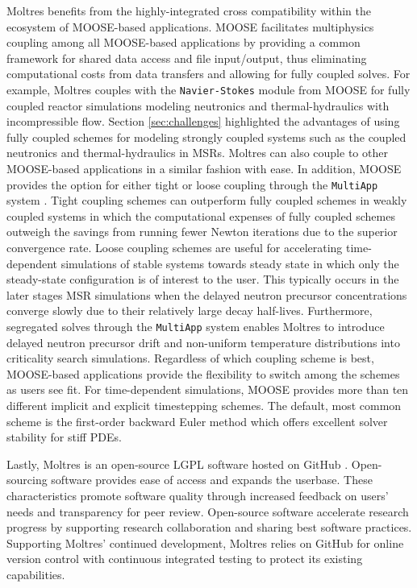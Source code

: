 Moltres benefits from the highly-integrated cross compatibility within the
ecosystem of MOOSE-based applications. MOOSE facilitates multiphysics coupling
among all MOOSE-based applications by providing a common framework for shared
data access and file input/output, thus eliminating computational costs from
data transfers and allowing for fully coupled solves. For example, Moltres
couples with the \texttt{Navier-Stokes} module \cite{peterson_overview_2018}
from MOOSE for fully coupled reactor simulations modeling neutronics and
thermal-hydraulics with incompressible flow. Section
\ref{sec:challenges} highlighted the advantages of using fully coupled schemes
for modeling strongly coupled systems such as the coupled
neutronics and thermal-hydraulics in \glspl{MSR}. Moltres can also
couple to other MOOSE-based applications in a similar fashion with ease. In
addition, MOOSE
provides the option for either tight or loose coupling through the
\texttt{MultiApp} system \cite{gaston_physics-based_2015}. Tight coupling
schemes can outperform fully coupled schemes in weakly coupled systems in which
the computational expenses of fully coupled schemes outweigh the savings from
running fewer Newton iterations due to the superior convergence rate. Loose
coupling schemes are useful for accelerating time-dependent simulations of
stable systems towards steady state in which only the steady-state
configuration is of interest to the user. This typically occurs in the later
stages \gls{MSR} simulations when the delayed neutron precursor concentrations
converge slowly due to their relatively large decay half-lives. Furthermore,
segregated solves through the \texttt{MultiApp} system enables Moltres to
introduce delayed neutron precursor drift and non-uniform temperature
distributions into criticality search simulations. Regardless of which
coupling scheme is best, MOOSE-based applications provide the flexibility
to switch among the schemes as users see fit. For time-dependent simulations,
MOOSE provides more than ten different implicit and explicit timestepping
schemes. The default, most common scheme is the first-order backward Euler
method which offers excellent solver stability for stiff \glspl{PDE}.

Lastly, Moltres is an open-source \gls{LGPL} software hosted on
GitHub \cite{github_build_2017}. Open-sourcing software provides ease of access
and expands the userbase. These characteristics promote software quality
through increased feedback on users' needs and transparency for peer review.
Open-source software accelerate research progress by supporting research
collaboration and sharing best software practices. Supporting Moltres'
continued development, Moltres relies on GitHub for online version control with
continuous integrated testing to protect its existing capabilities.

